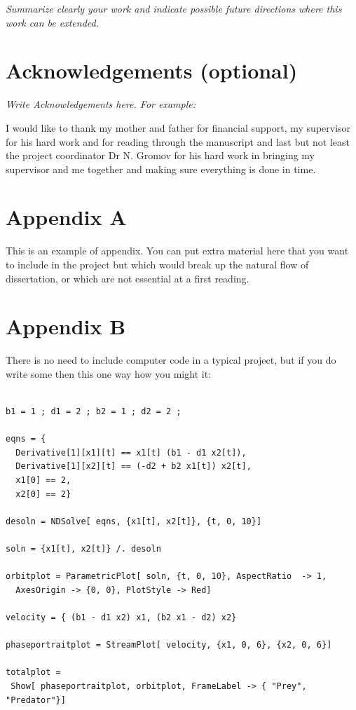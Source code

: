 \documentclass[a4paper,11pt]{article}
\numberwithin{equation}{section}
\theoremstyle{definition}
\begin{document}
{\it Summarize clearly your work and indicate possible future directions where this work can be extended.}

\section*{Acknowledgements (optional)}

{\it Write Acknowledgements here. For example: }

I would like to thank my mother and father for financial support,
my supervisor for his hard work and for reading through the manuscript
and last but not least the project coordinator Dr N. Gromov for his
hard work in bringing my supervisor and me together and making sure
everything is done in time.

\newpage
\section*{Appendix A}
This is an example of appendix. You can put extra material here that
you want to include in the project but which would break up the
natural flow of dissertation, or which are not essential at a first reading.

\section*{Appendix B}

There is no need to include computer code in a typical project, but if
you do write some then this one way how you might it:

\begin{verbatim}

b1 = 1 ; d1 = 2 ; b2 = 1 ; d2 = 2 ;

eqns = {
  Derivative[1][x1][t] == x1[t] (b1 - d1 x2[t]),
  Derivative[1][x2][t] == (-d2 + b2 x1[t]) x2[t],
  x1[0] == 2,
  x2[0] == 2}

desoln = NDSolve[ eqns, {x1[t], x2[t]}, {t, 0, 10}]

soln = {x1[t], x2[t]} /. desoln

orbitplot = ParametricPlot[ soln, {t, 0, 10}, AspectRatio  -> 1,
  AxesOrigin -> {0, 0}, PlotStyle -> Red]

velocity = { (b1 - d1 x2) x1, (b2 x1 - d2) x2}

phaseportraitplot = StreamPlot[ velocity, {x1, 0, 6}, {x2, 0, 6}]

totalplot = 
 Show[ phaseportraitplot, orbitplot, FrameLabel -> { "Prey", "Predator"}]

\end{verbatim}
\end{document}
